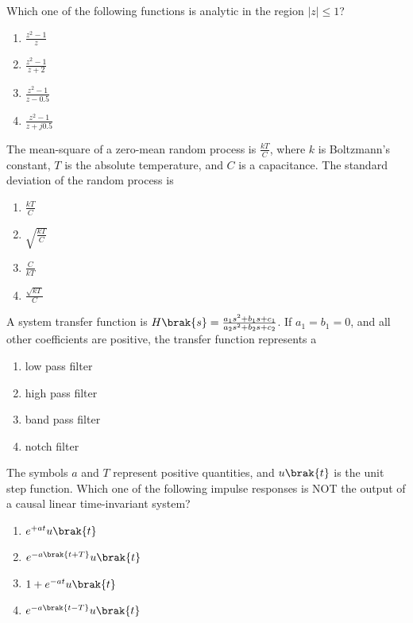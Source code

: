\iffalse
\chapter{2019}
\author{AI24BTECH11031}
\section{ee}
\fi

\item Which one of the following functions is analytic in the region $|z| \leq 1$?
\begin{multicols}{4}
\begin{enumerate}
    \item $\frac{z^2 - 1}{z}$
    \item $\frac{z^2 - 1}{z + 2}$
    \item $\frac{z^2 - 1}{z - 0.5}$
    \item $\frac{z^2 - 1}{z + j0.5}$
\end{enumerate}
\end{multicols}

\item The mean-square of a zero-mean random process is $\frac{kT}{C}$, where $k$
is Boltzmann’s constant, $T$ is the absolute temperature, and $C$ is a capacitance.
The standard deviation of the random process is
\begin{multicols}{4}
\begin{enumerate}
    \item $\frac{kT}{C}$
    \item $\sqrt{\frac{kT}{C}}$
    \item $\frac{C}{kT}$
    \item $\frac{\sqrt{kT}}{C}$
\end{enumerate}
\end{multicols}

\item A system transfer function is $H\brak{s} = \frac{a_1 s^2 + b_1 s + c_1}{a_2 s^2 + b_2 s + c_2}$.
If $a_1 = b_1 = 0$, and all other coefficients are positive, the transfer function represents a
\begin{enumerate}
    \item low pass filter
    \item high pass filter
    \item band pass filter
    \item notch filter
\end{enumerate}

\item The symbols $a$ and $T$ represent positive quantities, and $u\brak{t}$ is the unit
step function. Which one of the following impulse responses is NOT the output of a
causal linear time-invariant system?
\begin{multicols}{2}
\begin{enumerate}
    \item $e^{+at}u\brak{t}$
    \item $e^{-a\brak{t+T}}u\brak{t}$
    \item $1 + e^{-at}u\brak{t}$
    \item $e^{-a\brak{t-T}}u\brak{t}$
\end{enumerate}
\end{multicols}

